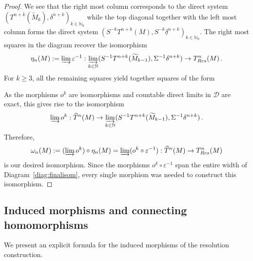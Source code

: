 \documentclass[12pt,a4paper]{article}
\numberwithin{equation}{section}
\theoremstyle{nonumberplain}
\newtheorem{proof}{Proof}
\begin{document}
\begin{proof}
We see that the right most column corresponds to the direct system $(T^{n+k}(\widetilde{M}_k), \delta^{n+k})_{k \in \mathbb{N}_0}$ while the top diagonal together with the left most column forms the direct system $(S^{-k}T^{n+k}(M), S^{-k}\underline{\delta}^{n+k})_{k \in \mathbb{N}_0}$. The right most squares in the diagram recover the isomorphism
\[ \eta_n(M) := \varinjlim \varepsilon^{-1}: \varinjlim_{k \in \mathbb{N}} (S^{-1}T^{n+k}(\widetilde{M}_{k-1}), \Sigma^{-1}\delta^{n+k}) \rightarrow T_{Res}^n(M) \, . \]
For $k \geq 3$, all the remaining squares yield together squares of the form
\begin{center}
\end{center}
As the morphisms $o^k$ are isomorphisms and countable direct limits in $\mathcal{D}$ are exact, this gives rise to the isomorphism
\[ \varinjlim o^k: \widehat{T}^n(M) \rightarrow \varinjlim_{k \in \mathbb{N}} (S^{-1}T^{n+k}(\widetilde{M}_{k-1}), \Sigma^{-1}\delta^{n+k}) \, . \]
Therefore,
\[ \omega_n(M) := (\varinjlim o^k) \circ \eta_n(M) = \varinjlim (o^k \circ \varepsilon^{-1}): \widehat{T}^n(M) \rightarrow T_{Res}^n(M) \]
is our desired isomorphism. Since the morphisms $o^k \circ \varepsilon^{-1}$ span the entire width of Diagram~\ref{diag:finalisom}, every single morphism was needed to construct this isomorphism.
\end{proof}

\subsection{Induced morphisms and connecting homomorphisms}

We present an explicit formula for the induced morphisms of the resolution construction.
\end{document}
